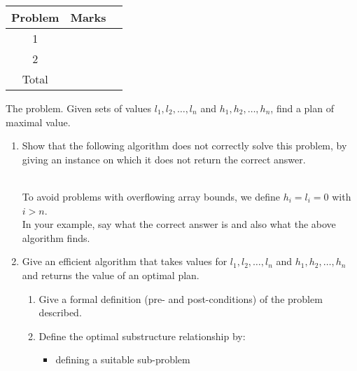 \documentclass{assignment}
\begin{document}
\begin{center}
\renewcommand{\arraystretch}{2}
\begin{tabular}{|c|c|c|} \hline
Problem & Marks \\ \hline \hline
1 & \\ \hline
2 & \\ \hline
Total & \\ \hline
\end{tabular}
\end{center}

\bigskip

\begin{problemlist}

\clearpage
\pbitem
\begin{problem}
The problem. Given sets of values $l_1, l_2, \ldots, l_n$ and $h_1, h_2, \ldots, h_n$, find a plan of maximal value.
\begin{enumerate}
\item Show that the following algorithm does not correctly solve this problem, by giving an instance on which it does not return the correct answer.
\IncMargin{3em}
\begin{algorithm}
\end{algorithm}
\DecMargin{3em}
\\To avoid problems with overflowing array bounds, we define $h_i=l_i=0$ with $i>n$.\\
In your example, say what the correct answer is and also what the above algorithm finds.
\item Give an efficient algorithm that takes values for $l_1, l_2, \ldots, l_n$ and $h_1, h_2, \ldots, h_n$ and returns the value of an optimal plan.
\begin{enumerate}
\item Give a formal definition (pre- and post-conditions) of the problem described.
\item Define the optimal substructure relationship by:
\begin{itemize}
\item defining a suitable sub-problem

\end{itemize}
\end{enumerate}
\end{enumerate}
\end{problem}
\end{problemlist}
\end{document}
